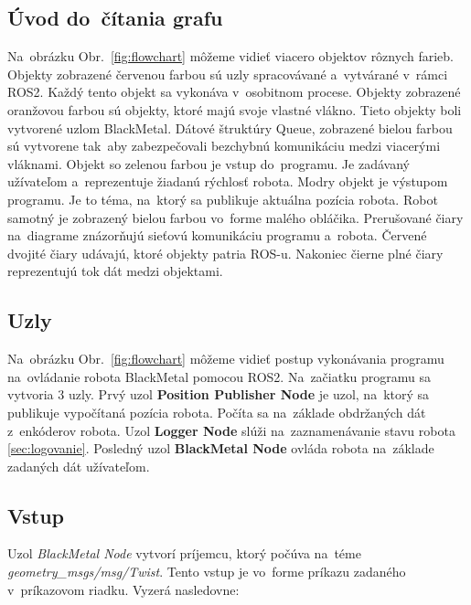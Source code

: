 \subsection{Úvod do~čítania grafu}
\label{sec:citanie_grafu}

Na~obrázku Obr.~\ref{fig:flowchart} môžeme vidieť viacero objektov rôznych farieb. Objekty zobrazené červenou farbou sú uzly spracovávané
a~vytvárané v~rámci ROS2. Každý tento objekt sa vykonáva v~osobitnom procese. Objekty zobrazené oranžovou farbou sú objekty, ktoré majú svoje
vlastné vlákno. Tieto objekty boli vytvorené uzlom BlackMetal. Dátové štruktúry Queue, zobrazené bielou farbou sú vytvorene  tak~aby
zabezpečovali bezchybnú komunikáciu medzi viacerými vláknami. Objekt so zelenou farbou je vstup do~programu. Je zadávaný užívateľom
a~reprezentuje žiadanú rýchlosť robota. Modry objekt je výstupom programu. Je to téma, na~ktorý sa publikuje aktuálna pozícia robota.
Robot samotný je zobrazený bielou farbou vo~forme malého obláčika. Prerušované čiary na~diagrame znázorňujú sieťovú komunikáciu programu
a~robota. Červené dvojité čiary udávajú, ktoré objekty patria ROS-u. Nakoniec čierne plné čiary reprezentujú tok dát medzi objektami.

\subsection{Uzly}

Na~obrázku Obr.~\ref{fig:flowchart} môžeme vidieť postup vykonávania programu na~ovládanie robota BlackMetal pomocou ROS2.
Na~začiatku programu sa vytvoria 3 uzly. Prvý uzol \textbf{Position Publisher Node} je uzol, na~ktorý sa publikuje vypočítaná pozícia robota.
Počíta sa na~základe obdržaných dát z~enkóderov robota. Uzol \textbf{Logger Node} slúži na~zaznamenávanie stavu robota \ref{sec:logovanie}.
Posledný uzol \textbf{BlackMetal Node} ovláda robota na~základe zadaných dát užívateľom.

\subsection{Vstup}

Uzol \textit{BlackMetal Node} vytvorí príjemcu, ktorý počúva na~téme \textit{geometry\_msgs/msg/Twist}. Tento vstup je vo~forme príkazu
zadaného v~príkazovom riadku. Vyzerá nasledovne:


